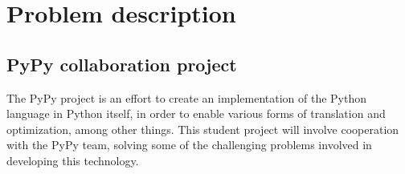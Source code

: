 

\chapter*{Problem description}

\section*{PyPy collaboration project}
The PyPy project is an effort to create an implementation of 
the Python language in Python itself, in order to enable various 
forms of translation and optimization, among other things. This 
student project will involve cooperation with the PyPy team, 
solving some of the challenging problems involved in developing 
this technology.
